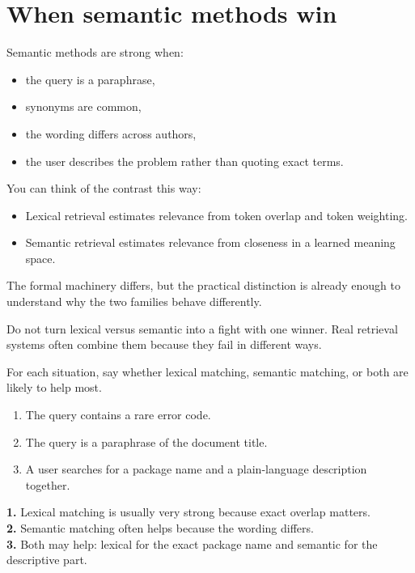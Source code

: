 \documentclass[11pt,oneside]{report}
\begin{document}
\section*{When semantic methods win}
Semantic methods are strong when:
\begin{itemize}
\item the query is a paraphrase,
\item synonyms are common,
\item the wording differs across authors,
\item the user describes the problem rather than quoting exact terms.
\end{itemize}

\begin{formulabox}
You can think of the contrast this way:
\begin{itemize}
\item Lexical retrieval estimates relevance from token overlap and token weighting.
\item Semantic retrieval estimates relevance from closeness in a learned meaning space.
\end{itemize}
The formal machinery differs, but the practical distinction is already enough to understand why the two families behave differently.
\end{formulabox}

\begin{warningbox}
Do not turn lexical versus semantic into a fight with one winner. Real retrieval systems often combine them because they fail in different ways.
\end{warningbox}

\begin{selfcheckbox}
For each situation, say whether lexical matching, semantic matching, or both are likely to help most.
\begin{enumerate}
\item The query contains a rare error code. 
\item The query is a paraphrase of the document title.
\item A user searches for a package name and a plain-language description together.
\end{enumerate}
\end{selfcheckbox}

\begin{answerbox}
\textbf{1.} Lexical matching is usually very strong because exact overlap matters.\\
\textbf{2.} Semantic matching often helps because the wording differs.\\
\textbf{3.} Both may help: lexical for the exact package name and semantic for the descriptive part.
\end{answerbox}
\end{document}
